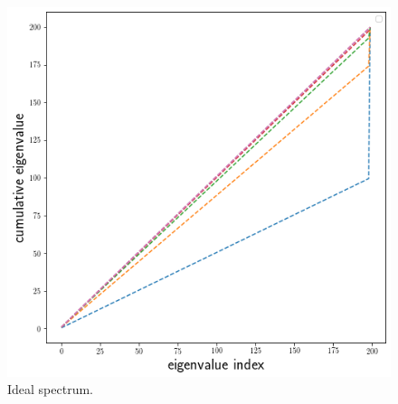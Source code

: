 \begin{figure}
\includegraphics[scale=0.22]{figs/dgn-fra-ecdf-ideal.png}
\caption{Ideal spectrum.}
\label{fig:ideal-spectrum}
\end{figure}
